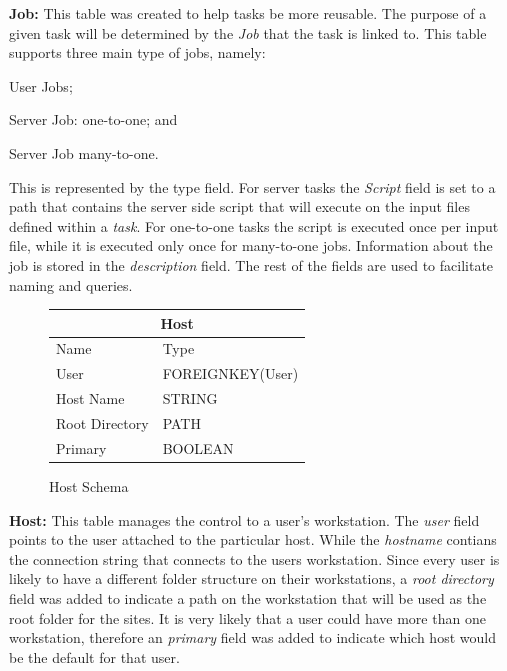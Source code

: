 \documentclass[12pt,a4paper]{report}
\begin{document}
\noindent\textbf{Job:} This table was created to help tasks be more reusable.
The purpose of a given task will be determined by the \emph{Job} that the task
is linked to. This table supports three main type of jobs, namely:
\begin{inparaenum}[(i)] \item User Jobs; \item Server Job: one-to-one; and \item
Server Job many-to-one.\end{inparaenum} This is represented by the type field.
For server tasks the \emph{Script} field is set to a path that contains the
server side script that will execute on the input files defined within a \emph{task}.
For one-to-one tasks  the script is executed once per input file, while it
is executed only once for many-to-one jobs. Information about the job is stored
in the \emph{description} field. The rest of the fields are used to facilitate
naming and queries.
\\
\begin{figure}
\begin{tabular}{l|l}
    \multicolumn{2}{c}{Host} \\
    \hline
    Name        & Type \\
    \hline
    User        & FOREIGNKEY(User)  \\
    Host Name   & STRING  \\
    Root Directory & PATH \\
    Primary      & BOOLEAN \\
\end{tabular}
\caption{Host Schema}
\end{figure}

\noindent\textbf{Host:} This table manages the control to a user's workstation.
The \emph{user} field points to the user attached to the particular host. While the
\emph{hostname} contians the connection string that connects to the users workstation.
Since every user is likely to have a different folder structure on their workstations,
a \emph{root directory} field was added to indicate a path on the workstation that
will be used as the root folder for the sites. It is very likely that a user could
have more than one workstation, therefore an \emph{primary} field was added to indicate
which host would be the default for that user.
\\
\end{document}
